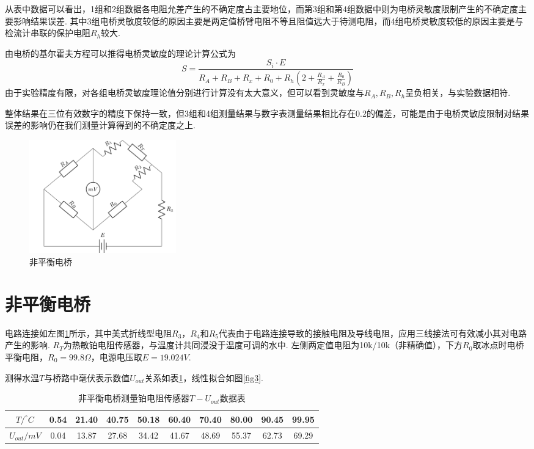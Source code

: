 \documentclass[12pt, a4paper]{ctexart}
\begin{document}
从表中数据可以看出，1组和2组数据各电阻允差产生的不确定度占主要地位，而第3组和第4组数据中则为电桥灵敏度限制产生的不确定度主要影响结果误差.
其中3组电桥灵敏度较低的原因主要是两定值桥臂电阻不等且阻值远大于待测电阻，而4组电桥灵敏度较低的原因主要是与检流计串联的保护电阻$R_h$较大.

由电桥的基尔霍夫方程可以推得电桥灵敏度的理论计算公式为
\begin{equation*}
    S = \frac{S_i \cdot E}{R_A + R_B + R_x + R_0 + R_h(2 + \frac{R_A}{R_x} + \frac{R_0}{R_B})}
\end{equation*}
由于实验精度有限，对各组电桥灵敏度理论值分别进行计算没有太大意义，但可以看到灵敏度与$R_A,R_B,R_h$呈负相关，与实验数据相符.

整体结果在三位有效数字的精度下保持一致，但3组和4组测量结果与数字表测量结果相比存在0.2\textperthousand 的偏差，可能是由于电桥灵敏度限制对结果误差的影响仍在我们测量计算得到的不确定度之上.

\begin{figure}
    \includegraphics[width=2.5in]{figure/circuit_unbalenced.png}
    \caption{非平衡电桥}
    \label{fig2}
\end{figure}

\section{非平衡电桥}

电路连接如左图\ref{fig2}所示\footnotemark，其中美式折线型电阻$R_3$，$R_4$和$R_5$代表由于电路连接导致的接触电阻及导线电阻，应用三线接法可有效减小其对电路产生的影响.
$R_T$为热敏铂电阻传感器，与温度计共同浸没于温度可调的水中.
左侧两定值电阻为10k/10k（非精确值），下方$R_0$取冰点时电桥平衡电阻，$R_0 = 99.8\Omega$，电源电压取$E = 19.024V$.

\clearpage

测得水温$T$与桥路中毫伏表示数值$U_{out}$关系如表\ref{t5}，线性拟合如图\ref{fig3}.

\begin{table}[htbp]
    \centering
    \begin{tabular}{cccccccccc}
        \toprule
        $T/^{\circ} C$ & 0.54 & 21.40 & 40.75 & 50.18 & 60.40 & 70.40 & 80.00 & 90.45 & 99.95 \\
        \midrule
        $U_{out}/mV$ & 0.04 & 13.87 & 27.68 & 34.42 & 41.67 & 48.69 & 55.37 & 62.73 & 69.29 \\
        \bottomrule
    \end{tabular}
    \caption{非平衡电桥测量铂电阻传感器$T-U_{out}$数据表}
    \label{t5}
\end{table}
\end{document}
